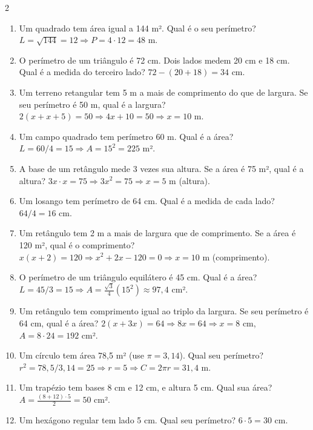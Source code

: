 \documentclass[11pt]{article}
\begin{document}
\begin{multicols}{2}
\begin{enumerate}
\item Um quadrado tem área igual a 144 m². Qual é o seu perímetro?  
{\color{red} $L=\sqrt{144}=12 \Rightarrow P=4\cdot 12=48$ m.}

\item O perímetro de um triângulo é 72 cm. Dois lados medem 20 cm e 18 cm. Qual é a medida do terceiro lado?  
{\color{red} $72-(20+18)=34$ cm.}

\item Um terreno retangular tem 5 m a mais de comprimento do que de largura. Se seu perímetro é 50 m, qual é a largura?  
{\color{red} $2(x+x+5)=50 \Rightarrow 4x+10=50 \Rightarrow x=10$ m.}

\item Um campo quadrado tem perímetro 60 m. Qual é a área?  
{\color{red} $L=60/4=15 \Rightarrow A=15^2=225$ m².}

\item A base de um retângulo mede 3 vezes sua altura. Se a área é 75 m², qual é a altura?  
{\color{red} $3x \cdot x=75 \Rightarrow 3x^2=75 \Rightarrow x=5$ m (altura).}

\item Um losango tem perímetro de 64 cm. Qual é a medida de cada lado?  
{\color{red} $64/4=16$ cm.}

\item Um retângulo tem 2 m a mais de largura que de comprimento. Se a área é 120 m², qual é o comprimento?  
{\color{red} $x(x+2)=120 \Rightarrow x^2+2x-120=0 \Rightarrow x=10$ m (comprimento).}

\item O perímetro de um triângulo equilátero é 45 cm. Qual é a área?  
{\color{red} $L=45/3=15 \Rightarrow A=\frac{\sqrt{3}}{4}(15^2)\approx 97,4$ cm².}

\item Um retângulo tem comprimento igual ao triplo da largura. Se seu perímetro é 64 cm, qual é a área?  
{\color{red} $2(x+3x)=64 \Rightarrow 8x=64 \Rightarrow x=8$ cm, $A=8 \cdot 24=192$ cm².}

\item Um círculo tem área 78,5 m² (use $\pi = 3,14$). Qual seu perímetro?  
{\color{red} $r^2=78,5/3,14=25 \Rightarrow r=5 \Rightarrow C=2\pi r=31,4$ m.}

\item Um trapézio tem bases 8 cm e 12 cm, e altura 5 cm. Qual sua área?  
{\color{red} $A=\frac{(8+12)\cdot 5}{2}=50$ cm².}

\item Um hexágono regular tem lado 5 cm. Qual seu perímetro?  
{\color{red} $6\cdot 5=30$ cm.}


\end{enumerate}
\end{multicols}
\end{document}
